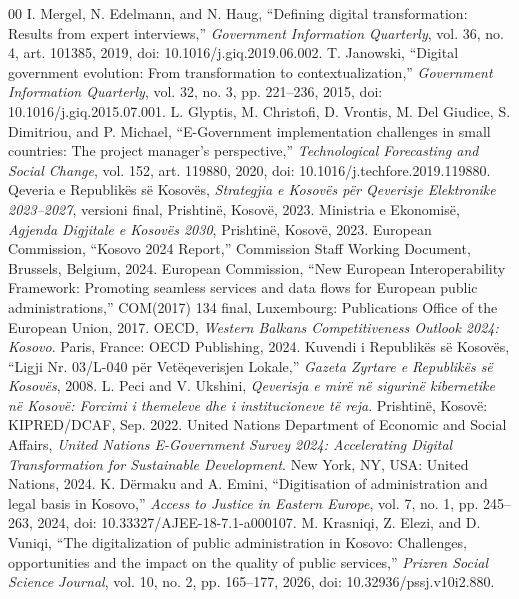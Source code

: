\documentclass[conference]{IEEEtran}
\begin{document}
\begin{thebibliography}{00}
 I. Mergel, N. Edelmann, and N. Haug, ``Defining digital transformation: Results from expert interviews,'' \emph{Government Information Quarterly}, vol. 36, no. 4, art. 101385, 2019, doi: 10.1016/j.giq.2019.06.002.
 T. Janowski, ``Digital government evolution: From transformation to contextualization,'' \emph{Government Information Quarterly}, vol. 32, no. 3, pp. 221--236, 2015, doi: 10.1016/j.giq.2015.07.001.
 L. Glyptis, M. Christofi, D. Vrontis, M. Del Giudice, S. Dimitriou, and P. Michael, ``E-Government implementation challenges in small countries: The project manager's perspective,'' \emph{Technological Forecasting and Social Change}, vol. 152, art. 119880, 2020, doi: 10.1016/j.techfore.2019.119880.
 Qeveria e Republikës së Kosovës, \emph{Strategjia e Kosovës për Qeverisje Elektronike 2023--2027}, versioni final, Prishtinë, Kosovë, 2023.
 Ministria e Ekonomisë, \emph{Agjenda Digjitale e Kosovës 2030}, Prishtinë, Kosovë, 2023.
 European Commission, ``Kosovo 2024 Report,'' Commission Staff Working Document, Brussels, Belgium, 2024.
 European Commission, ``New European Interoperability Framework: Promoting seamless services and data flows for European public administrations,'' COM(2017) 134 final, Luxembourg: Publications Office of the European Union, 2017.
 OECD, \emph{Western Balkans Competitiveness Outlook 2024: Kosovo}. Paris, France: OECD Publishing, 2024.
 Kuvendi i Republikës së Kosovës, ``Ligji Nr. 03/L-040 për Vetëqeverisjen Lokale,'' \emph{Gazeta Zyrtare e Republikës së Kosovës}, 2008.
 L. Peci and V. Ukshini, \emph{Qeverisja e mirë në sigurinë kibernetike në Kosovë: Forcimi i themeleve dhe i institucioneve të reja}. Prishtinë, Kosovë: KIPRED/DCAF, Sep. 2022.
 United Nations Department of Economic and Social Affairs, \emph{United Nations E-Government Survey 2024: Accelerating Digital Transformation for Sustainable Development}. New York, NY, USA: United Nations, 2024.
 K. Dërmaku and A. Emini, ``Digitisation of administration and legal basis in Kosovo,'' \emph{Access to Justice in Eastern Europe}, vol. 7, no. 1, pp. 245--263, 2024, doi: 10.33327/AJEE-18-7.1-a000107.
 M. Krasniqi, Z. Elezi, and D. Vuniqi, ``The digitalization of public administration in Kosovo: Challenges, opportunities and the impact on the quality of public services,'' \emph{Prizren Social Science Journal}, vol. 10, no. 2, pp. 165--177, 2026, doi: 10.32936/pssj.v10i2.880.

\end{thebibliography}
\end{document}
